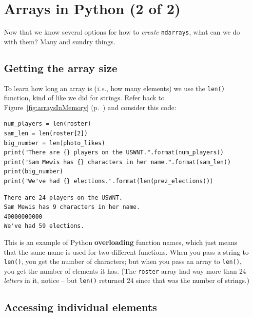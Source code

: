 
\chapter{Arrays in Python (2 of 2)}
\label{ch:arraysInPython2}


Now that we know several options for how to \textit{create} \texttt{ndarrays},
what can we do with them? Many and sundry things.

\section{Getting the array size}

To learn how long an array is (\textit{i.e.}, how many elements) we use the
\texttt{len()} function, kind of like we did for strings. Refer back to
Figure~\ref{fig:arraysInMemory} (p.~\pageref{fig:arraysInMemory}) and consider
this code:

\begin{Verbatim}[fontsize=\footnotesize,samepage=true,frame=single,framesep=3mm]
num_players = len(roster)
sam_len = len(roster[2])
big_number = len(photo_likes)
print("There are {} players on the USWNT.".format(num_players))
print("Sam Mewis has {} characters in her name.".format(sam_len))
print(big_number)
print("We've had {} elections.".format(len(prez_elections)))
\end{Verbatim}

\begin{Verbatim}[fontsize=\footnotesize,samepage=true,frame=single,framesep=3mm]
There are 24 players on the USWNT.
Sam Mewis has 9 characters in her name.
40000000000
We've had 59 elections.
\end{Verbatim}

\label{overloading}
This is an example of Python \textbf{overloading} function names, which just
means that the same name is used for two different functions. When you pass a
string to \texttt{len()}, you get the number of characters; but when you pass
an array to \texttt{len()}, you get the number of elements it has.
(The \texttt{roster} array had way more than 24 \textit{letters} in it, notice
-- but \texttt{len()} returned 24 since that was the number of strings.)

\section{Accessing individual elements}

